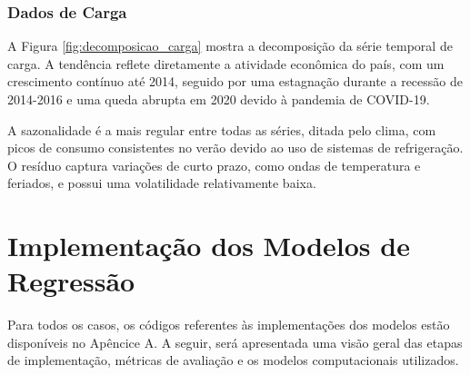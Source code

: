 \subsubsection{Dados de Carga} %
\begin{figure}[!ht]
  {}
  {}
\end{figure}
A Figura \ref{fig:decomposicao_carga} mostra a decomposição da série temporal de carga. A tendência
reflete diretamente a atividade econômica do país, com um crescimento contínuo até 2014, seguido por uma estagnação durante 
a recessão de 2014-2016 e uma queda abrupta em 2020 devido à pandemia de COVID-19. \cite{Magazzino2021}

A sazonalidade é a mais regular entre todas as séries, ditada pelo clima, com picos de consumo consistentes no verão devido 
ao uso de sistemas de refrigeração. O resíduo captura variações de curto prazo, como ondas de temperatura e feriados, e 
possui uma volatilidade relativamente baixa.


\section{Implementação dos Modelos de Regressão} %
Para todos os casos, os códigos referentes às implementações dos modelos estão disponíveis no Apêncice A. A seguir, será
apresentada uma visão geral das etapas de implementação, métricas de avaliação e os modelos computacionais utilizados.


